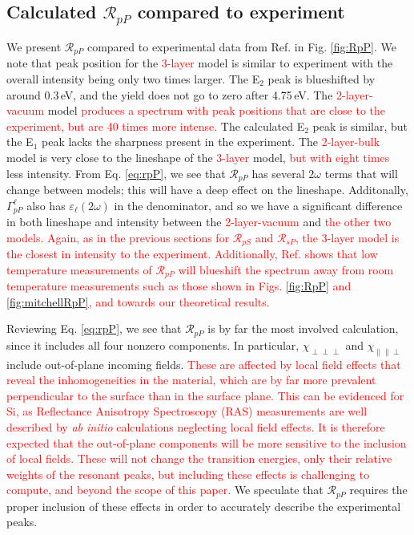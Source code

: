 \documentclass[prb,superscriptaddress,showpacs,twocolumn,letterpaper]{revtex4}
\newcommand{\correction}[1]{\textcolor{red}{#1}}
\newcommand{\change}[1]{\textcolor{red}{#1}}
\begin{document}
\subsection{Calculated \texorpdfstring{$\mathcal{R}_{pP}$}{RpP} compared to
experiment}\label{sec:RpP}

We present $\mathcal{R}_{pP}$ compared to experimental data from Ref.
 in Fig. \ref{fig:RpP}. We note that peak position for
the \correction{3-layer} model is similar to experiment with the overall
intensity being only two times larger. The E$_{2}$ peak is blueshifted by around
0.3\,eV, and the yield does not go to zero after 4.75\,eV. The
\correction{2-layer-vacuum} model
\change{produces a spectrum with peak positions that are close to the
experiment, but are 40 times more intense.} %
The calculated E$_{2}$ peak is similar, but the E$_{1}$ peak lacks the sharpness
present in the experiment. The \correction{2-layer-bulk} model is very close to
the lineshape of the
\correction{3-layer} model,
\correction{but with eight times} %
less intensity. From Eq. \eqref{eq:rpP}, we see that $\mathcal{R}_{pP}$ has
several $2\omega$ terms that will change between models; this will have a deep
effect on the lineshape. Additonally, $\Gamma^{\ell}_{pP}$ also has
$\varepsilon_{\ell}(2\omega)$ in the denominator, and so we have a significant
difference in both lineshape and intensity between the
\correction{2-layer-vacuum} and
\correction{the other two models. Again, as in the previous sections for
$\mathcal{R}_{pS}$ and $\mathcal{R}_{sP}$, the \correction{3-layer} model is the
closest in intensity to the experiment.} %
\correction{Additionally, Ref.  shows that low temperature
measurements of $\mathcal{R}_{pP}$ will blueshift the spectrum away from room
temperature measurements such as those shown in Figs. \ref{fig:RpP} and
\ref{fig:mitchellRpP}, and towards our theoretical results.} %

Reviewing Eq. \eqref{eq:rpP}, we see that $\mathcal{R}_{pP}$ is by far the most
involved calculation, since it includes all four nonzero components. In
particular, $\chi_{\perp\perp\perp}$ and $\chi_{\parallel\parallel\perp}$
include out-of-plane incoming fields.
\correction{
These are affected by local field effects\cite{tancognedejean:tel-01235611} that
reveal the inhomogeneities in the material, which are by far more prevalent
perpendicular to the surface than in the surface plane. This can be evidenced
for Si, as Reflectance Anisotropy Spectroscopy (RAS) measurements are well
described by \emph{ab initio} calculations neglecting local field
effects.\cite{palummoPRB99, gaalPRB09} It is therefore expected that the
out-of-plane components will be more sensitive to the inclusion of local fields.
These will not change the transition energies, only their relative weights of
the resonant peaks,\cite{tancognedejean:tel-01235611} but including these
effects is challenging to compute,\cite{nicolasPRB15} and beyond the scope of
this paper.
}
We speculate that $\mathcal{R}_{pP}$ requires the
proper inclusion of these effects in order to accurately describe the
experimental peaks.
\end{document}
